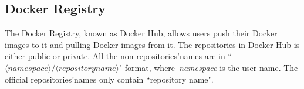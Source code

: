









\subsection{Docker Registry}

The Docker Registry, known as Docker Hub, allows users push their Docker images to it and pulling Docker images from it.
%
%
The repositories in Docker Hub is either public or private.
%
All the non-repositories'names are in ``$\langle namespace\rangle/\langle repository name \rangle$" format, where~\textit{namespace} is the user name.
%
The official repositories'names only contain ``repository name".
%
%



